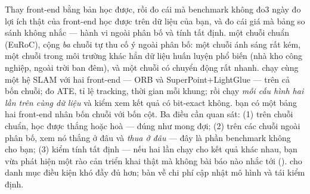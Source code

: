 \documentclass[../../vslam.tex]{subfiles}
\begin{document}
\begin{ungdung}
\end{ungdung}

\begin{duan}{Thay front-end bằng bản học được, rồi đo cái mà benchmark không đo}{3 ngày}
\dmt đo lợi ích thật của front-end học được trên dữ liệu của bạn, và đo cái giá mà bảng so sánh không nhắc --- hành vi ngoài phân bố và tính tất định.
\ddl một chuỗi chuẩn (EuRoC), cộng \emph{ba} chuỗi tự thu cố ý ngoài phân bố: một chuỗi ánh sáng rất kém, một chuỗi trong môi trường khác hẳn dữ liệu huấn luyện phổ biến (nhà kho công nghiệp, ngoài trời ban đêm), và một chuỗi có chuyển động rất nhanh.
\dbc chạy cùng một hệ SLAM với hai front-end --- ORB và SuperPoint\(+\)LightGlue --- trên cả bốn chuỗi; đo ATE, tỉ lệ tracking, thời gian mỗi khung; rồi chạy \emph{mỗi cấu hình hai lần trên cùng dữ liệu} và kiểm xem kết quả có bit-exact không.
\dxk bạn có một bảng hai front-end nhân bốn chuỗi với bốn cột. Ba điều cần quan sát: (1) trên chuỗi chuẩn, học được thắng hoặc hoà --- đúng như mong đợi; (2) trên các chuỗi ngoài phân bố, xem nó thắng ở đâu và \emph{thua ở đâu} --- đây là phần benchmark không cho bạn; (3) kiểm tính tất định --- nếu hai lần chạy cho kết quả khác nhau, bạn vừa phát hiện một rào cản triển khai thật mà không bài báo nào nhắc tới ().
\dnv {} cho danh mục điều kiện khó đầy đủ hơn;  bàn về chi phí cập nhật mô hình và tái kiểm định.
\end{duan}
\end{document}
